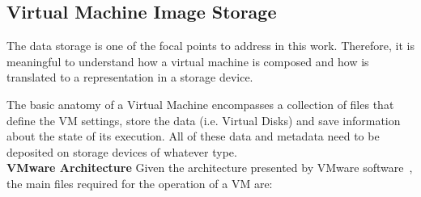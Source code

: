 
\nocite{Nuno2016}
\nocite{Eduardo2016}
\nocite{P2020}


\subsection{Virtual Machine Image Storage} %
\label{sub:vm_storage}

The data storage is one of the focal points to address in this work. Therefore, it is meaningful to understand how a virtual machine is composed and how is translated to a representation in a storage device.

The basic anatomy of a Virtual Machine encompasses a collection of files that define the VM settings, store the data (i.e. Virtual Disks) and save information about the state of its execution. All of these data and metadata need to be deposited on storage devices of whatever type. \\

\textbf{VMware Architecture} \quad Given the architecture presented by VMware software~\cite{VMWare_VMFiles}, the main files required for the operation of a VM are:


